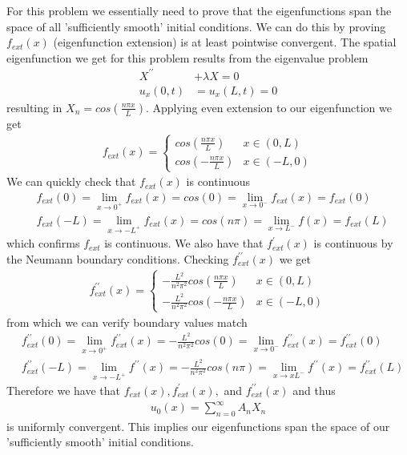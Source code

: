 \documentclass[12pt]{article}
\theoremstyle{remark}
\begin{document}
For this problem we essentially need to prove that the eigenfunctions span the space of all 'sufficiently smooth' initial conditions. We can do this by proving $f_{ext}(x)$ (eigenfunction extension) is at least pointwise convergent. The spatial eigenfunction we get for this problem results from the eigenvalue problem
\begin{align*}
	X^{\prime\prime} & + \lambda X = 0 \\
	u_x(0,t) &= u_x(L,t) = 0 
\end{align*}
resulting in $X_n = cos(\frac{n\pi x}{L})$. Applying even extension to our eigenfunction we get
\begin{align*}
	f_{ext}(x) = 
	\begin{cases}
	cos(\frac{n\pi x}{L}) & x \in (0,L) \\
	cos(-\frac{n\pi x}{L}) & x \in (-L,0)
	\end{cases}
\end{align*}
We can quickly check that $f_{ext}(x)$ is continuous
\begin{align*}
	& f_{ext}(0) = \lim_{x \rightarrow 0^+} f_{ext}(x) = cos(0) = \lim_{x \rightarrow 0^-}f_{ext}(x) = f_{ext}(0) \\
	& f_{ext}(-L) = \lim_{x \rightarrow -L^+} f_{ext}(x) = cos(n\pi) = \lim_{x \rightarrow L^-} f(x) = f_{ext}(L)
\end{align*}
which confirms $f_{ext}$ is continuous. We also have that $f^\prime_{ext}(x)$ is continuous by the Neumann boundary conditions. Checking $f^{\prime\prime}_{ext}(x)$ we get
\begin{align*}
	f^{\prime\prime}_{ext}(x) = 
	\begin{cases}
	-\frac{L^2}{n^2\pi^2}cos(\frac{n\pi x}{L}) & x \in (0,L) \\
	-\frac{L^2}{n^2\pi^2}cos(-\frac{n\pi x}{L}) & x \in (-L,0)
	\end{cases}
\end{align*}
from which we can verify boundary values match
\begin{align*}
	& f^{\prime\prime}_{ext}(0) = \lim_{x \rightarrow 0^+} f^{\prime\prime}_{ext}(x) = -\frac{L^2}{n^2\pi^2}cos(0) = \lim_{x \rightarrow 0^-} f^{\prime\prime}_{ext}(x) = f^{\prime\prime}_{ext}(0) \\
	& f^{\prime\prime}_{ext}(-L) = \lim_{x \rightarrow -L^+} f^{\prime\prime}(x) = -\frac{L^2}{n^2\pi^2}cos(n\pi) = \lim_{x \rightarrow x L^-}f^{\prime\prime}(x) = f^{\prime\prime}_{ext}(L)
\end{align*}
Therefore we have that $f_{ext}(x), f^\prime_{ext}(x),$ and $f^{\prime\prime}_{ext}(x)$ and thus 
\begin{align}
	u_0(x) = \sum\limits_{n=0}^\infty A_nX_n
\end{align} 
is uniformly convergent. This implies our eigenfunctions span the space of our 'sufficiently smooth' initial conditions. \\
\end{document}
